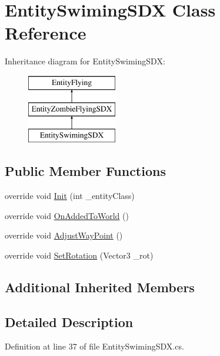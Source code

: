 \hypertarget{class_entity_swiming_s_d_x}{}\section{Entity\+Swiming\+S\+DX Class Reference}
\label{class_entity_swiming_s_d_x}
Inheritance diagram for Entity\+Swiming\+S\+DX\+:\begin{figure}[H]
\begin{center}
\leavevmode
\includegraphics[height=3.000000cm]{class_entity_swiming_s_d_x}
\end{center}
\end{figure}
\subsection*{Public Member Functions}
\begin{DoxyCompactItemize}
\item 
override void \mbox{\hyperlink{class_entity_swiming_s_d_x_acc349e8ff9afcdf5cbbadb8c4b2e8f92}{Init}} (int \+\_\+entity\+Class)
\item 
override void \mbox{\hyperlink{class_entity_swiming_s_d_x_a7ad69a9b6d2777bb904742c40b3eb4fe}{On\+Added\+To\+World}} ()
\item 
override void \mbox{\hyperlink{class_entity_swiming_s_d_x_a8af397ffcf21b5433962243f2e110373}{Adjust\+Way\+Point}} ()
\item 
override void \mbox{\hyperlink{class_entity_swiming_s_d_x_ac234efe645a6e92f4c73aa182b98d601}{Set\+Rotation}} (Vector3 \+\_\+rot)
\end{DoxyCompactItemize}
\subsection*{Additional Inherited Members}


\subsection{Detailed Description}


Definition at line 37 of file Entity\+Swiming\+S\+D\+X.\+cs.




